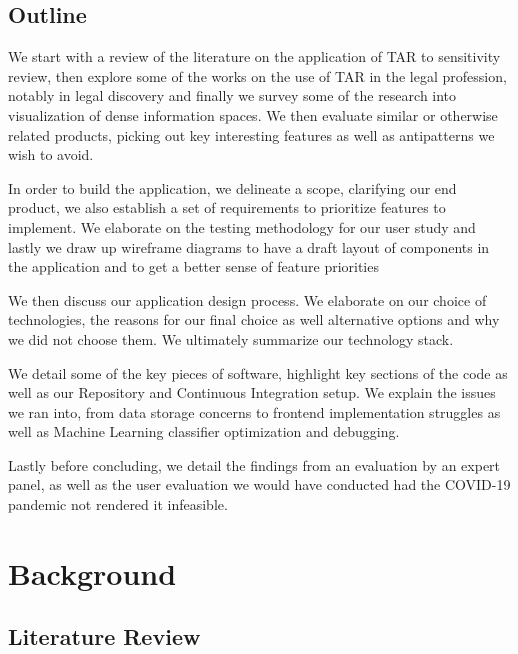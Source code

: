 \documentclass[\version]{l4proj}
\begin{document}
\section{Outline}

We start with a review of the literature on the application of TAR to sensitivity review, then explore some of the works on the use of TAR in the legal profession, notably in legal discovery and finally we survey some of the research into visualization of dense information spaces.
We then evaluate similar or otherwise related products, picking out key interesting features as well as antipatterns we wish to avoid.

In order to build the application, we delineate a scope, clarifying our end product, we also establish a set of requirements to prioritize features to implement.
We elaborate on the testing methodology for our user study and lastly we draw up wireframe diagrams to have a draft layout of components in the application and to get a better sense of feature priorities

We then discuss our application design process. We elaborate on our choice of technologies, the reasons for our final choice as well alternative options and why we did not choose them. We ultimately summarize our technology stack.

We detail some of the key pieces of software, highlight key sections of the code as well as our Repository and Continuous Integration setup.
We explain the issues we ran into, from data storage concerns to frontend implementation struggles as well as Machine Learning classifier optimization and debugging.

Lastly before concluding, we detail the findings from an evaluation by an expert panel, as well as the user evaluation we would have conducted had the COVID-19 pandemic not rendered it infeasible.


\chapter{Background}

\section{Literature Review}
\end{document}
